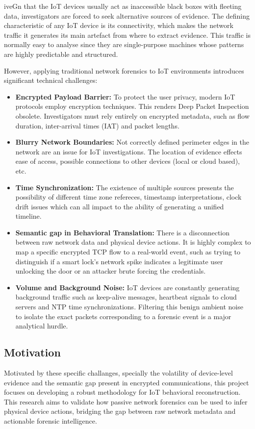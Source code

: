 iveGn that the IoT devices usually act as inaccessible black boxes with fleeting data, investigators are forced to seek alternative sources of evidence. The defining characteristic of any IoT device is its connectivity, which makes the network traffic it generates its main artefact from where to extract evidence. This traffic is normally easy to analyse since they are single-purpose machines whose patterns are highly predictable and structured. 

However, applying traditional network forensics to IoT environments introduces significant technical challenges:

\begin{itemize}
	\item \textbf{Encrypted Payload Barrier:} To protect the user privacy, modern IoT protocols employ encryption techniques. This renders Deep Packet Inspection obsolete. Investigators must rely entirely on encrypted metadata, such as flow duration, inter-arrival times (IAT) and packet lengths. 
	\item \textbf{Blurry Network Boundaries:} Not correctly defined perimeter edges in the network are an issue for IoT investigations. The location of evidence effects ease of access, possible connections to other devices (local or cloud based), etc. 
	\item \textbf{Time Synchronization:} The existence of multiple sources presents the possibility of different time zone refereces, timestamp interpretations, clock drift issues which can all impact to the ability of generating a unified timeline\cite{Lillis2016}.
	\item \textbf{Semantic gap in Behavioral Translation:} There is a disconnection between raw network data and physical device actions. It is highly complex to map a specific encrypted TCP flow to a real-world event, such as trying to distinguish if a smart lock's network spike indicates a legitimate user unlocking the door or an attacker brute forcing the credentials. 
	\item \textbf{Volume and Background Noise:} IoT devices are constantly generating background traffic such as keep-alive messages, heartbeat signals to cloud servers and NTP time synchronizations. Filtering this benign ambient noise to isolate the exact packets corresponding to a forensic event is a major analytical hurdle. 
\end{itemize}


\subsection{Motivation}
Motivated by these specific challanges, specially the volatility of device-level evidence and the semantic gap present in encrypted communications, this project focuses on developing a robust methodology for IoT behavioral reconstruction. This research aims to validate how passive network forensics can be used to infer physical device actions, bridging the gap between raw network metadata and actionable forensic intelligence. 


